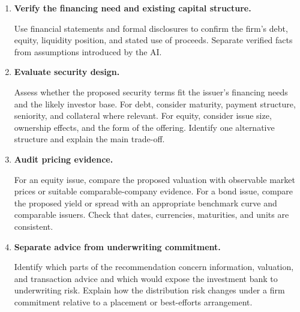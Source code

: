 \begin{enumerate}

\item \textbf{Verify the financing need and existing capital structure.}

Use financial statements and formal disclosures to confirm the firm's debt, equity, liquidity position, and stated use of proceeds. Separate verified facts from assumptions introduced by the AI.

\item \textbf{Evaluate security design.}

Assess whether the proposed security terms fit the issuer's financing needs and the likely investor base. For debt, consider maturity, payment structure, seniority, and collateral where relevant. For equity, consider issue size, ownership effects, and the form of the offering. Identify one alternative structure and explain the main trade-off.

\item \textbf{Audit pricing evidence.}

For an equity issue, compare the proposed valuation with observable market prices or suitable comparable-company evidence. For a bond issue, compare the proposed yield or spread with an appropriate benchmark curve and comparable issuers. Check that dates, currencies, maturities, and units are consistent.

\item \textbf{Separate advice from underwriting commitment.}

Identify which parts of the recommendation concern information, valuation, and transaction advice and which would expose the investment bank to underwriting risk. Explain how the distribution risk changes under a firm commitment relative to a placement or best-efforts arrangement.

\end{enumerate}


